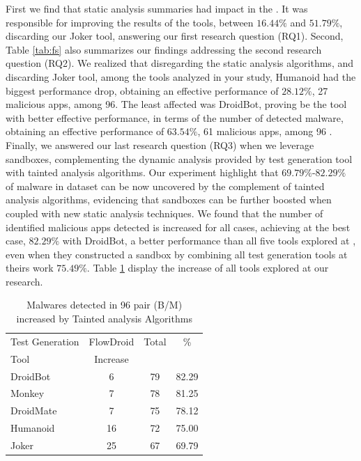 First we find that static analysis summaries had impact in the \blls. It was responsible for improving the results of the tools, between $16.44\%$ and $51.79\%$, discarding our Joker tool, answering our first research question (RQ1). Second, Table \ref{tab:fs} also summarizes our findings addressing the second research question (RQ2). We realized that disregarding the static analysis algorithms, and discarding Joker tool, among the tools analyzed in your study, Humanoid had the biggest performance drop, obtaining an effective performance of $28.12\%$, 27 malicious apps, among 96. The least affected was DroidBot, proving be the tool with better effective performance, in terms of the number of detected malware, obtaining an effective performance of $63.54\%$, 61 malicious apps, among 96 . Finally, we answered our last research question (RQ3) when we leverage sandboxes, complementing the dynamic analysis provided by test generation tool with tainted analysis algorithms. Our experiment highlight that $69.79\%$-$82.29\%$ of malware in dataset can be now uncovered by the complement of tainted analysis algorithms, evidencing that 
sandboxes can be further boosted when coupled with new static analysis techniques. We found that the number of identified malicious apps detected is increased for all cases, achieving at the best case, $82.29\%$ with DroidBot, a better performance than all five tools explored at \blls, even when they constructed a sandbox by combining all test generation tools at theirs work $75.49\%$. Table \ref{tab:tanted} display the increase of all tools explored at our research.

\begin{table}[ht]
\centering
\begin{tabular}{lccc}\toprule
 Test Generation & FlowDroid & Total & \%\\
 Tool & Increase  &  & \\ \midrule
 DroidBot & 6 & 79 & 82.29\\
 Monkey & 7 &  78 & 81.25 \\
 DroidMate & 7 & 75 & 78.12  \\
 Humanoid & 16 & 72 & 75.00 \\
 Joker & 25 & 67 & 69.79  \\\midrule
 
\end{tabular} 
\caption{Malwares detected in 96 pair (B/M) increased by Tainted analysis Algorithms}
\label{tab:tanted}
\end{table}




